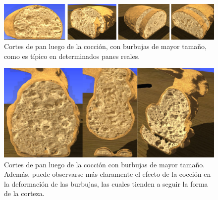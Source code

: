 \documentclass[spanish,a4paper,openright,11pt]{book}
\begin{document}
\begin{figure}[!ht]
\begin{center}
\includegraphics[width=15cm]{figures/baked}
\caption{Cortes de pan luego de la cocción, con burbujas de mayor tamaño, como es típico en determinados panes reales.}
\label{fg:bigalveoli}
\end{center}
\end{figure}

\begin{figure}[!ht]
\begin{center}
\includegraphics[width=15cm]{figures/bakedbunny}
\caption{Cortes de pan luego de la cocción con burbujas de mayor tamaño. Además, puede observarse más claramente el efecto de la cocción en la deformación de las burbujas, las cuales tienden a seguir la forma de la corteza.}
\label{fg:bakedbunny}
\end{center}
\end{figure}





\end{document}
